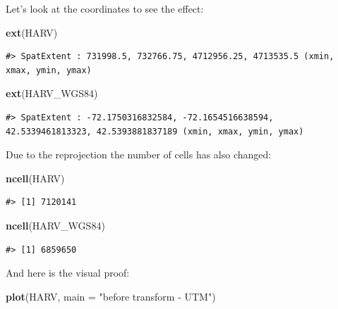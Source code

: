 \documentclass[
]{book}
\newenvironment{Shaded}{\begin{snugshade}}{\end{snugshade}}
\newcommand{\AttributeTok}[1]{\textcolor[rgb]{0.13,0.29,0.53}{#1}}
\newcommand{\FunctionTok}[1]{\textcolor[rgb]{0.13,0.29,0.53}{\textbf{#1}}}
\newcommand{\NormalTok}[1]{#1}
\newcommand{\StringTok}[1]{\textcolor[rgb]{0.31,0.60,0.02}{#1}}
\begin{document}
Let's look at the coordinates to see the effect:

\begin{Shaded}
\begin{Highlighting}[]
\FunctionTok{ext}\NormalTok{(HARV)}
\end{Highlighting}
\end{Shaded}

\begin{verbatim}
#> SpatExtent : 731998.5, 732766.75, 4712956.25, 4713535.5 (xmin, xmax, ymin, ymax)
\end{verbatim}

\begin{Shaded}
\begin{Highlighting}[]
\FunctionTok{ext}\NormalTok{(HARV\_WGS84)}
\end{Highlighting}
\end{Shaded}

\begin{verbatim}
#> SpatExtent : -72.1750316832584, -72.1654516638594, 42.5339461813323, 42.5393881837189 (xmin, xmax, ymin, ymax)
\end{verbatim}

Due to the reprojection the number of cells has also changed:

\begin{Shaded}
\begin{Highlighting}[]
\FunctionTok{ncell}\NormalTok{(HARV)}
\end{Highlighting}
\end{Shaded}

\begin{verbatim}
#> [1] 7120141
\end{verbatim}

\begin{Shaded}
\begin{Highlighting}[]
\FunctionTok{ncell}\NormalTok{(HARV\_WGS84)}
\end{Highlighting}
\end{Shaded}

\begin{verbatim}
#> [1] 6859650
\end{verbatim}

And here is the visual proof:

\begin{Shaded}
\begin{Highlighting}[]
\FunctionTok{plot}\NormalTok{(HARV, }\AttributeTok{main =} \StringTok{"before transform {-} UTM"}\NormalTok{)}
\end{Highlighting}
\end{Shaded}
\end{document}
